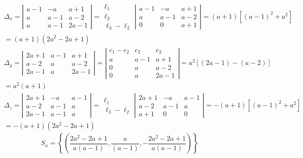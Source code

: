\begin{enumerate}
{$$
\begin{aligned}
& \Delta_x=\left|\begin{array}{ccc}
a-1 & -a & a+1 \\
a & a-1 & a-2 \\
a & a-1 & 2 a-1
\end{array}\right|=\begin{array}{c}
\ell_1 \\
\ell_2 \\
\ell_3-\ell_2
\end{array}\left|\begin{array}{ccc}
a-1 & -a & a+1 \\
a & a-1 & a-2 \\
0 & 0 & a+1
\end{array}\right|=(a+1)\left[(a-1)^2+a^2\right] \\
& =(a+1)\left(2 a^2-2 a+1\right) \\
& \Delta_y=\left|\begin{array}{ccc}
2 a+1 & a-1 & a+1 \\
a-2 & a & a-2 \\
2 a-1 & a & 2 a-1
\end{array}\right|=\left|\begin{array}{ccc}
c_1-c_2 & c_2 & c_3 \\
a & a-1 & a+1 \\
0 & a & a-2 \\
0 & a & 2 a-1
\end{array}\right|=a^2[(2 a-1)-(a-2)] \\
& =a^2(a+1) \\
& \Delta_z=\left|\begin{array}{ccc}
2 a+1 & -a & a-1 \\
a-2 & a-1 & a \\
2 a-1 & a-1 & a
\end{array}\right|=\begin{array}{c}
\ell_1 \\
\ell_3-\ell_2
\end{array}\left|\begin{array}{ccc}
2 a+1 & -a & a-1 \\
a-2 & a-1 & a \\
a+1 & 0 & 0
\end{array}\right|=-(a+1)\left[(a-1)^2+a^2\right] \\
& =-(a+1)\left(2 a^2-2 a+1\right)
\end{aligned}
$$
$$S_a=\left\{\left(\frac{2 a^2-2 a+1}{a(a-1)}, \frac{a}{(a-1)},-\frac{2 a^2-2 a+1}{a(a-1)}\right)\right\}$$ }

\end{enumerate}